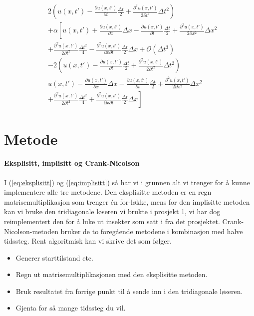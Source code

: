 \documentclass[norsk, 10pt]{article}
\begin{document}
\begin{align*}
&2\left(u(x,t')-\frac{\partial u(x,t')}{\partial t}\frac{\Delta t}{2}+\frac{\partial ^2 u(x,t')}{2\partial t^2}\Delta t^2\right) \\
&+\alpha\left[ u(x,t')+\frac{\partial u(x,t')}{\partial x}\Delta x-\frac{\partial u(x,t')}{\partial t} \frac{\Delta t}{2} +\frac{\partial^2 u(x,t')}{2\partial x^2}\Delta x^2\right.\\ 
&+\frac{\partial^2 u(x,t')}{2\partial t^2}\frac{\Delta t^2}{4} -\frac{\partial^2 u(x,t')}{\partial x\partial t}\frac{\Delta t}{2} \Delta x+ \mathcal{O}(\Delta t^3)   \\
&-2\left(u(x,t')-\frac{\partial u(x,t')}{\partial t}\frac{\Delta t}{2}+\frac{\partial ^2 u(x,t')}{2\partial t^2}\Delta t^2 \right) \\
&u(x,t')-\frac{\partial u(x,t')}{\partial x}\Delta x-\frac{\partial u(x,t')}{\partial t} \frac{\Delta t}{2} +\frac{\partial^2 u(x,t')}{2\partial x^2}\Delta x^2 \\
&\left.+\frac{\partial^2 u(x,t')}{2\partial t^2}\frac{\Delta t^2}{4} +\frac{\partial^2 u(x,t')}{\partial x\partial t}\frac{\Delta t}{2} \Delta x\right]
\end{align*}



\section*{Metode}
\paragraph{Eksplisitt, implisitt og Crank-Nicolson}
I (\ref{eq:eksplisitt}) og (\ref{eq:implisitt}) så har vi i grunnen alt vi trenger for å kunne implementere alle tre metodene. Den eksplisitte metoden er en regn matrisemultiplikasjon som trenger én for-løkke, mens for den implisitte metoden kan vi bruke den tridiagonale løseren vi brukte i prosjekt 1, vi har dog reimplementert den for å luke ut insekter som satt i fra det prosjektet. Crank-Nicolson-metoden bruker de to foregående metodene i kombinasjon med halve tidssteg. Rent algoritmisk kan vi skrive det som følger.
\begin{itemize}
\item
Generer starttilstand etc.
\item
Regn ut matrisemultiplikasjonen med den eksplisitte metoden.
\item
Bruk resultatet fra forrige punkt til å sende inn i den tridiagonale løseren.
\item
Gjenta for så mange tidssteg du vil.
\end{itemize}
\end{document}
